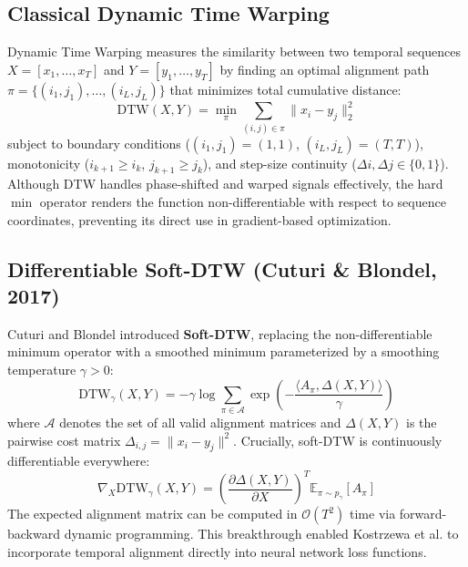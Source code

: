 \documentclass[11pt,a4paper]{report}
\begin{document}
\subsection{Classical Dynamic Time Warping}
Dynamic Time Warping \cite{sakoe1978dynamic} measures the similarity between two temporal sequences $X = [x_1, \dots, x_T]$ and $Y = [y_1, \dots, y_T]$ by finding an optimal alignment path $\pi = \{(i_1, j_1), \dots, (i_L, j_L)\}$ that minimizes total cumulative distance:
\begin{equation}
    \text{DTW}(X, Y) = \min_{\pi} \sum_{(i,j) \in \pi} \|x_i - y_j\|_2^2
\end{equation}
subject to boundary conditions ($(i_1, j_1) = (1,1)$, $(i_L, j_L) = (T,T)$), monotonicity ($i_{k+1} \ge i_k$, $j_{k+1} \ge j_k$), and step-size continuity ($\Delta i, \Delta j \in \{0, 1\}$). Although DTW handles phase-shifted and warped signals effectively, the hard $\min$ operator renders the function non-differentiable with respect to sequence coordinates, preventing its direct use in gradient-based optimization.

\subsection{Differentiable Soft-DTW (Cuturi \& Blondel, 2017)}
Cuturi and Blondel \cite{cuturi2017soft} introduced \textbf{Soft-DTW}, replacing the non-differentiable minimum operator with a smoothed minimum parameterized by a smoothing temperature $\gamma > 0$:
\begin{equation}
    \text{DTW}_\gamma(X, Y) = -\gamma \log \sum_{\pi \in \mathcal{A}} \exp\left(-\frac{\langle A_\pi, \Delta(X,Y) \rangle}{\gamma}\right)
\end{equation}
where $\mathcal{A}$ denotes the set of all valid alignment matrices and $\Delta(X,Y)$ is the pairwise cost matrix $\Delta_{i,j} = \|x_i - y_j\|^2$. Crucially, soft-DTW is continuously differentiable everywhere:
\begin{equation}
    \nabla_X \text{DTW}_\gamma(X, Y) = \left(\frac{\partial \Delta(X,Y)}{\partial X}\right)^T \mathbb{E}_{\pi \sim p_\gamma}[A_\pi]
\end{equation}
The expected alignment matrix can be computed in $\mathcal{O}(T^2)$ time via forward-backward dynamic programming. This breakthrough enabled Kostrzewa et al. \cite{kostrzewa2026towards} to incorporate temporal alignment directly into neural network loss functions.
\end{document}
